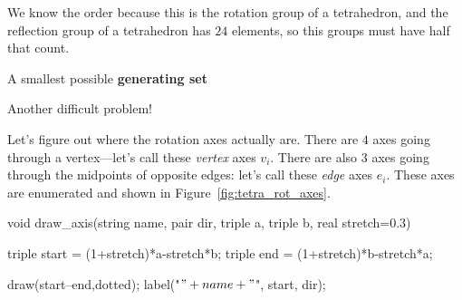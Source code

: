 \documentclass[../key.tex]{subfiles}
\begin{document}
\noindent We know the order because this is the rotation group of a tetrahedron, and the reflection group of a tetrahedron has $24$ elements, so this groups must have half that count.

\begin{inner_problem}
\item A smallest possible \textbf{generating set}
\end{inner_problem}

\noindent Another difficult problem!

Let's figure out where the rotation axes actually are. There are $4$ axes going through a vertex---let's call these \textit{vertex} axes $v_i$. There are also $3$ axes going through the midpoints of opposite edges: let's call these \textit{edge} axes $e_i$. These axes are enumerated and shown in Figure~\ref{fig:tetra_rot_axes}.

\begin{asydef}
void draw_axis(string name, pair dir, triple a, triple b, real stretch=0.3) {
	triple start = (1+stretch)*a-stretch*b;
	triple end = (1+stretch)*b-stretch*a;

	draw(start--end,dotted);
	label("$" + name + "$", start, dir);
}
\end{asydef}
\end{document}
